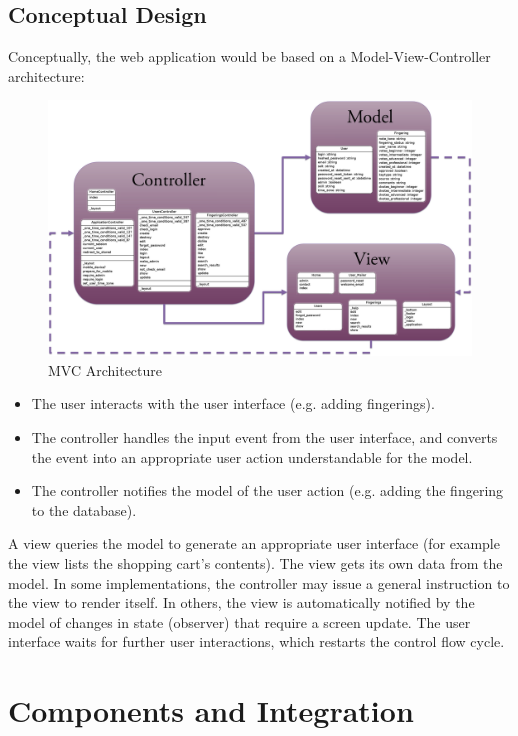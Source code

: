 \documentclass[12pt,english]{article}
\begin{document}
\subsection{Conceptual Design}
Conceptually, the web application would be based on a Model-View-Controller
architecture: 

\begin{figure}[h]
\begin{center}
\caption{MVC Architecture}
\includegraphics[scale=0.125]{MVC}
\end{center}
\end{figure}

\begin{itemize}
\item The user interacts with the user interface (e.g. adding fingerings). 
\item The controller handles the input event from the user interface, and converts the event into an appropriate user action understandable for the model. 
\item The controller notifies the model of the user action (e.g. adding the fingering to the database).
\end{itemize}
A view queries the model to generate an appropriate user interface
(for example the view lists the shopping cart's contents). The view
gets its own data from the model. In some implementations, the controller
may issue a general instruction to the view to render itself. In others,
the view is automatically notified by the model of changes in state
(observer) that require a screen update. The user interface waits for further user interactions, which restarts
the control flow cycle.

\clearpage
\section{Components and Integration}
\end{document}
